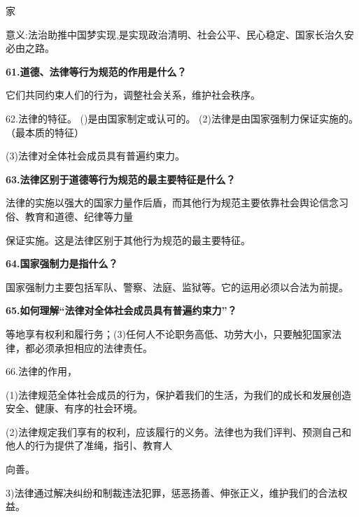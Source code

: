 \documentclass[lang=cn,11pt]{elegantbook}
\begin{document}
家\par

意义:法治助推中国梦实现,是实现政治清明、社会公平、民心稳定、国家长治久安必由之路。\par

\textbf{61.道德、法律等行为规范的作用是什么？}\par

它们共同约束人们的行为，调整社会关系，维护社会秩序。\par

62.法律的特征。 ()是由国家制定或认可的。 (2)法律是由国家强制力保证实施的。（最本质的特征）\par

(3)法律对全体社会成员具有普遍约束力。\par

\textbf{63.法律区别于道德等行为规范的最主要特征是什么？}\par

法律的实施以强大的国家力量作后盾，而其他行为规范主要依靠社会舆论信念习俗、教育和道德、纪律等力量\par

保证实施。这是法律区别于其他行为规范的最主要特征。\par

\textbf{64.国家强制力是指什么？}\par

国家强制力主要包括军队、警察、法庭、监狱等。它的运用必须以合法为前提。\par

\textbf{65.如何理解“法律对全体社会成员具有普遍约束力”？}\par

等地享有权利和履行务；(3)任何人不论职务高低、功劳大小，只要触犯国家法律，都必须承担相应的法律责任。\par

66.法律的作用，\par

(1)法律规范全体社会成员的行为，保护着我们的生活，为我们的成长和发展创造安全、健康、有序的社会环境。\par

(2)法律规定我们享有的权利，应该履行的义务。法律也为我们评判、预测自己和他人的行为提供了准绳，指引、教育人\par

向善。\par

3)法律通过解决纠纷和制裁违法犯罪，惩恶扬善、伸张正义，维护我们的合法权益。\par
\end{document}
